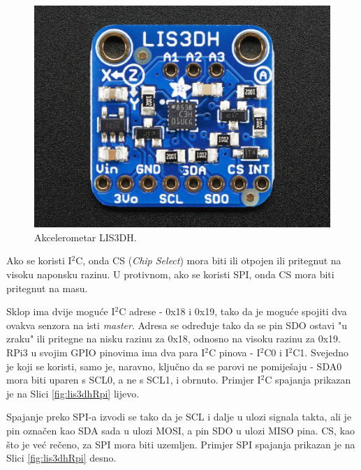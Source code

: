 \documentclass[12pt,a4paper]{article}
\begin{document}
		\begin{figure}[h!]
			\includegraphics[width=\linewidth]{slike/lis3dh.jpg}
			\caption{Akcelerometar LIS3DH.}
			\label{fig:lis3dh}
		\end{figure}

		\par Ako se koristi I$^2$C, onda CS (\textit{Chip Select}) mora biti ili otpojen ili pritegnut na visoku naponsku razinu. U protivnom, ako se koristi SPI, onda CS mora biti pritegnut na masu.

		\par Sklop ima dvije moguće I$^2$C adrese - 0x18 i 0x19, tako da je moguće spojiti dva ovakva senzora na isti \textit{master}. Adresa se određuje tako da se pin SDO ostavi "u zraku" ili pritegne na nisku razinu za 0x18, odnosno na visoku razinu za 0x19. \\
		RPi3 u svojim GPIO pinovima ima dva para I$^2$C pinova - I$^2$C0 i I$^2$C1. Svejedno je koji se koristi, samo je, naravno, ključno da se parovi ne pomiješaju - SDA0 mora biti uparen s SCL0, a ne s SCL1, i obrnuto. Primjer I$^2$C spajanja prikazan je na Slici \ref{fig:lis3dhRpi} lijevo.

		\par Spajanje preko SPI-a izvodi se tako da je SCL i dalje u ulozi signala takta, ali je pin označen kao SDA sada u ulozi MOSI, a pin SDO u ulozi MISO pina. CS, kao što je već rečeno, za SPI mora biti uzemljen. Primjer SPI spajanja prikazan je na Slici \ref{fig:lis3dhRpi} desno.
\end{document}
